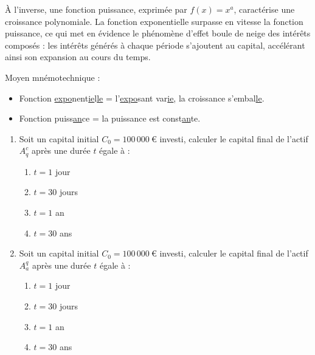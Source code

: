 \documentclass{article}
\begin{document}
\begin{enumerate}[label=\textbf{Q1.\arabic*}]
\begin{tcolorbox}
	      	À l'inverse, une fonction puissance, exprimée par $f(x)=x^a$, caractérise une croissance polynomiale. La fonction exponentielle surpasse en vitesse la fonction puissance, ce qui met en évidence le phénomène d'effet boule de neige des intérêts composés : les intérêts générés à chaque période s'ajoutent au capital, accélérant ainsi son expansion au cours du temps.
	      	
	      	Moyen mnémotechnique : 
	      	\begin{itemize}
	      		\item Fonction \underline{expo}nent\underline{ie}l\underline{le} = l'\underline{expo}sant var\underline{ie}, la croissance s'embal\underline{le}.
	      		\item Fonction puiss\underline{an}ce = la puissance est const\underline{an}te.
	      	\end{itemize}
	      \end{tcolorbox}
	      
	      \begin{enumerate}[label=\textbf{Q2.\arabic*}]
	      	\item Soit un capital initial \( C_0 = 100\,000\ \text{€} \) investi, calculer le capital final de l'actif \( A_q^c \) après une durée \( t \) égale à :
	      	      \begin{enumerate}[label=(\alph*)]
	      	      	\item \( t = 1 \) jour
	      	      	\item \( t = 30 \) jours
	      	      	\item \( t = 1 \) an
	      	      	\item \( t = 30 \) ans
	      	      \end{enumerate}
	      	          
	      	\item Soit un capital initial \( C_0 = 100\,000\ \text{€} \) investi, calculer le capital final de l'actif \( A_a^q \) après une durée \( t \) égale à :
	      	      \begin{enumerate}[label=(\alph*)]
	      	      	\item \( t = 1 \) jour
	      	      	\item \( t = 30 \) jours
	      	      	\item \( t = 1 \) an
	      	      	\item \( t = 30 \) ans
	      	      \end{enumerate}
	      	      

\end{enumerate}
\end{enumerate}
\end{document}
